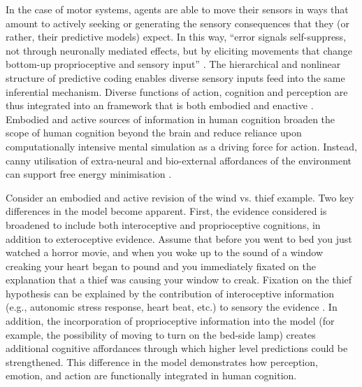 \begin{CJK}{UTF8}{gbsn}
In the case of motor systems, agents are able to move their sensors in ways that amount to actively seeking or generating the sensory consequences that they (or rather, their predictive models) expect.  In this way, ``error signals self-suppress, not through neuronally mediated effects, but by eliciting movements that change bottom-up proprioceptive and sensory input'' \citep[][1349]{Friston2003}.  The hierarchical and nonlinear structure of predictive coding enables diverse sensory inputs feed into the same inferential mechanism.  Diverse functions of action, cognition and perception are thus integrated into an framework that is both embodied and enactive \citep{Friston2015}.  Embodied and active sources of information in human cognition broaden the scope of human cognition beyond the brain and reduce reliance upon computationally intensive mental simulation as a driving force for action.  Instead, canny utilisation of extra-neural and bio-external affordances of the environment can support free energy minimisation \citep{Clark2015}.

Consider an embodied and active revision of the wind vs. thief example.  Two key differences in the model become apparent.  First, the evidence considered is broadened to include both interoceptive and proprioceptive cognitions, in addition to exteroceptive evidence.  Assume that before you went to bed you just watched a horror movie, and when you woke up to the sound of a window creaking your heart began to pound and you immediately fixated on the explanation that a thief was causing your window to creak.  Fixation on the thief hypothesis can be explained by the contribution of interoceptive information (e.g., autonomic stress response, heart beat, etc.) to sensory the evidence \citep{Pezzulo2014}.  In addition, the incorporation of proprioceptive information into the model (for example, the possibility of moving to turn on the bed-side lamp) creates additional cognitive affordances through which higher level predictions could be strengthened.  This difference in the model demonstrates how perception, emotion, and action are functionally integrated in human cognition.


\end{CJK}
